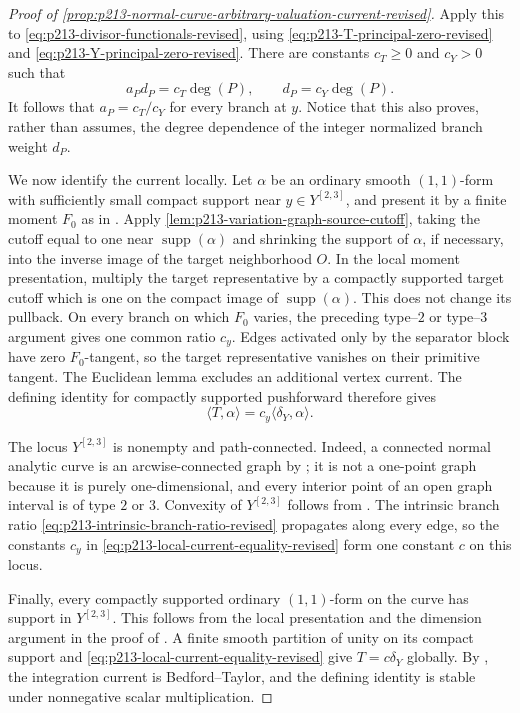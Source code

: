 \begin{proof}[Proof of
\cref{prop:p213-normal-curve-arbitrary-valuation-current-revised}]
Apply this to \eqref{eq:p213-divisor-functionals-revised}, using
\eqref{eq:p213-T-principal-zero-revised} and
\eqref{eq:p213-Y-principal-zero-revised}.  There are constants
$c_T\geq0$ and $c_Y>0$ such that
\[
                  a_Pd_P=c_T\deg(P),
                  \qquad d_P=c_Y\deg(P).
\]
It follows that $a_P=c_T/c_Y$ for every branch at $y$.  Notice that this
also proves, rather than assumes, the degree dependence of the integer
normalized branch weight $d_P$.

We now identify the current locally.  Let $\alpha$ be an ordinary smooth
$(1,1)$-form with sufficiently small compact support near
$y\in Y^{[2,3]}$, and present it by a finite moment $F_0$ as in
\cite[Proposition~15.1.1(b)]{CLD25}.  Apply
\cref{lem:p213-variation-graph-source-cutoff}, taking the cutoff equal to
one near $\operatorname{supp}(\alpha)$ and shrinking the support of
$\alpha$, if necessary, into the inverse image of the target neighborhood
$O$.  In the local moment presentation, multiply the target representative
by a compactly supported target cutoff which is one on the compact image
of $\operatorname{supp}(\alpha)$.  This does not change its pullback.
On every branch on which $F_0$ varies, the preceding type--$2$ or
type--$3$ argument gives one common ratio $c_y$.  Edges activated only by
the separator block have zero $F_0$-tangent, so the target representative
vanishes on their primitive tangent.  The Euclidean lemma excludes an
additional vertex current.  The defining identity for compactly supported
pushforward therefore gives
\begin{equation}
                         \langle T,\alpha\rangle
                    =c_y\langle\delta_Y,\alpha\rangle.
\label{eq:p213-local-current-equality-revised}
\end{equation}

The locus $Y^{[2,3]}$ is nonempty and path-connected.  Indeed, a connected
normal analytic curve is an arcwise-connected graph by
\cite[Theorem~3.5.1 and \S1.3.5]{Ducros24CurveStructure}; it is not a
one-point graph because it is purely one-dimensional, and every interior
point of an open graph interval is of type $2$ or $3$.  Convexity of
$Y^{[2,3]}$ follows from \cite[\S4.5.11]{Ducros24CurveStructure}.
The intrinsic branch ratio
\eqref{eq:p213-intrinsic-branch-ratio-revised} propagates along every
edge, so the constants $c_y$ in
\eqref{eq:p213-local-current-equality-revised} form one constant $c$ on
this locus.

Finally, every compactly supported ordinary $(1,1)$-form on the curve has
support in $Y^{[2,3]}$.  This follows from the local presentation
\cite[Proposition~15.1.1(b)]{CLD25} and the dimension argument in the
proof of \cite[Proposition~15.2.1(a)]{CLD25}.  A finite smooth partition
of unity on its compact support and
\eqref{eq:p213-local-current-equality-revised} give
$T=c\delta_Y$ globally.  By \cite[Example~8.6.4]{CLD25}, the integration
current is Bedford--Taylor, and the defining identity is stable under
nonnegative scalar multiplication.
\end{proof}

